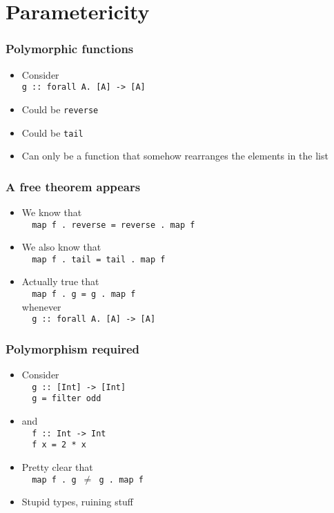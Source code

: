 \documentclass{beamer}
\begin{document}
\section{Parametericity}

\begin{frame}[fragile]
    \frametitle{Polymorphic functions}

\begin{itemize}
    \item Consider \\
        \verb?g :: forall A. [A] -> [A]?\\
    \item Could be \verb?reverse?
    \item Could be \verb?tail?
    \item Can only be a function that somehow rearranges the elements in the list
\end{itemize}

\end{frame}

\begin{frame}[fragile]
    \frametitle{A free theorem appears}

\begin{itemize}
    \item We know that \\
    \verb?  map f . reverse = reverse . map f?
    \item We also know that\\
    \verb?  map f . tail = tail . map f?
    \item Actually true that\\
    \verb?  map f . g = g . map f?\\
    whenever\\
    \verb?  g :: forall A. [A] -> [A]?\\
\end{itemize}

\end{frame}

\begin{frame}[fragile]
    \frametitle{Polymorphism required}
\begin{itemize}
    \item Consider\\
    \verb?  g :: [Int] -> [Int]?\\
    \verb?  g = filter odd?
    \item and\\
    \verb?  f :: Int -> Int?\\
    \verb?  f x = 2 * x?
    \item Pretty clear that\\
    \verb?  map f . g ?$\ne$\verb? g . map f?
    \item Stupid types, ruining stuff
\end{itemize}
\end{frame}
\end{document}
